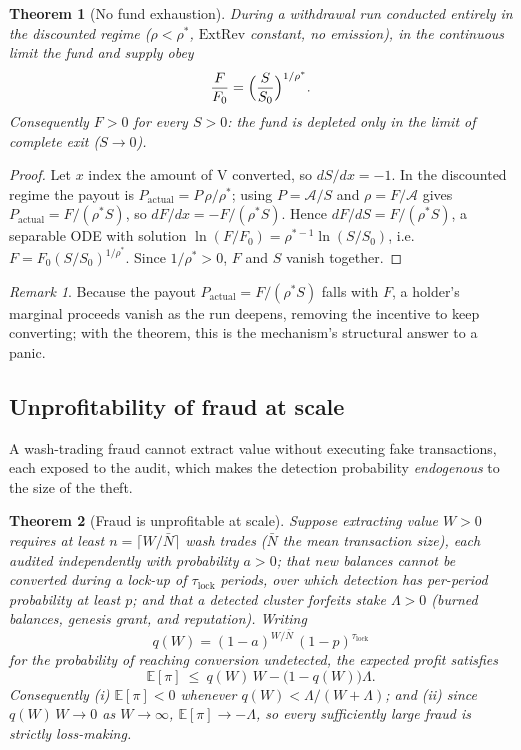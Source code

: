 \documentclass[11pt]{article}
\theoremstyle{plain}
\newtheorem{theorem}{Theorem}
\theoremstyle{definition}
\theoremstyle{remark}
\newtheorem{remark}{Remark}
\newcommand{\V}{\mathrm{V}}
\newcommand{\ExtRev}{\mathrm{ExtRev}}
\begin{document}
\begin{theorem}[No fund exhaustion]\label{thm:norun}
During a withdrawal run conducted entirely in the discounted regime ($\rho<\rho^*$, $\ExtRev$ constant, no emission), in the continuous limit the fund and supply obey
\[
\frac{F}{F_0}=\Bigl(\frac{S}{S_0}\Bigr)^{1/\rho^*}.
\]
Consequently $F>0$ for every $S>0$: the fund is depleted only in the limit of complete exit ($S\to0$).
\end{theorem}

\begin{proof}
Let $x$ index the amount of $\V$ converted, so $dS/dx=-1$. In the discounted regime the payout is $P_{\mathrm{actual}}=P\,\rho/\rho^*$; using $P=\mathcal{A}/S$ and $\rho=F/\mathcal{A}$ gives $P_{\mathrm{actual}}=F/(\rho^*S)$, so $dF/dx=-F/(\rho^*S)$. Hence $dF/dS=F/(\rho^*S)$, a separable ODE with solution $\ln(F/F_0)=\rho^{*-1}\ln(S/S_0)$, i.e.\ $F=F_0(S/S_0)^{1/\rho^*}$. Since $1/\rho^*>0$, $F$ and $S$ vanish together.
\end{proof}

\begin{remark}
Because the payout $P_{\mathrm{actual}}=F/(\rho^*S)$ falls with $F$, a holder's marginal proceeds vanish as the run deepens, removing the incentive to keep converting; with the theorem, this is the mechanism's structural answer to a panic.
\end{remark}

\subsection{Unprofitability of fraud at scale}

A wash-trading fraud cannot extract value without executing fake transactions, each exposed to the audit, which makes the detection probability \emph{endogenous} to the size of the theft.

\begin{theorem}[Fraud is unprofitable at scale]\label{thm:fraud}
Suppose extracting value $W>0$ requires at least $n=\lceil W/\bar N\rceil$ wash trades ($\bar N$ the mean transaction size), each audited independently with probability $a>0$; that new balances cannot be converted during a lock-up of $\tau_{\mathrm{lock}}$ periods, over which detection has per-period probability at least $p$; and that a detected cluster forfeits stake $\Lambda>0$ (burned balances, genesis grant, and reputation). Writing
\[
q(W)=(1-a)^{W/\bar N}\,(1-p)^{\tau_{\mathrm{lock}}}
\]
for the probability of reaching conversion undetected, the expected profit satisfies
\[
\mathbb{E}[\pi]\ \le\ q(W)\,W-\bigl(1-q(W)\bigr)\Lambda .
\]
Consequently \textup{(i)} $\mathbb{E}[\pi]<0$ whenever $q(W)<\Lambda/(W+\Lambda)$; and \textup{(ii)} since $q(W)\,W\to0$ as $W\to\infty$, $\mathbb{E}[\pi]\to-\Lambda$, so every sufficiently large fraud is strictly loss-making.
\end{theorem}
\end{document}
